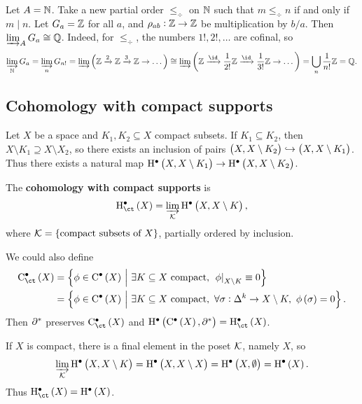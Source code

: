 \begin{example*}
Let $ A = \mathbb{N} $. Take a new partial order $ \le_{\div} $ on $ \mathbb{N} $ such that $ m \le_{\div} n $ if and only if $ m \mid n $. Let $ G_a = \mathbb{Z} $ for all $ a $, and $ \rho_{ab} : \mathbb{Z} \to \mathbb{Z} $ be multiplication by $ b / a $. Then $ \varinjlim_A G_a \cong \mathbb{Q} $. Indeed, for $ \le_{\div} $, the numbers $ 1!, 2!, \dots $ are cofinal, so
$$ \varinjlim_\NN G_a = \varinjlim_n G_{n!} = \varinjlim \br{\ZZ \xrightarrow{2} \ZZ \xrightarrow{3} \ZZ \to \dots} \cong \varinjlim \br{\ZZ \xrightarrow{\id} \dfrac{1}{2!}\ZZ \xrightarrow{\id} \dfrac{1}{3!}\ZZ \to \dots} = \bigcup_n \dfrac{1}{n!}\ZZ = \QQ. $$
\end{example*}

\subsection{Cohomology with compact supports}

Let $ X $ be a space and $ K_1, K_2 \subseteq X $ compact subsets. If $ K_1 \subseteq K_2 $, then $ X \setminus K_1 \supseteq X \setminus X_2 $, so there exists an inclusion of pairs $ \br{X, X \setminus K_2} \hookrightarrow \br{X, X \setminus K_1} $. Thus there exists a natural map $ \H^\bullet\br{X, X \setminus K_1} \to \H^\bullet\br{X, X \setminus K_2} $.

\begin{definition*}
The \textbf{cohomology with compact supports} is
$$ \Hc^\bullet\br{X} = \varinjlim_\KKK \H^\bullet\br{X, X \setminus K}, $$
where $ \KKK = \cbr{\text{compact subsets of} \ X} $, partially ordered by inclusion.
\end{definition*}

\begin{remark*}
We could also define
\begin{align*}
\C_{\ct}^\bullet\br{X}
& = \cbr{\phi \in \C^\bullet\br{X} \st \exists K \subseteq X \ \text{compact}, \ \eval{\phi}_{X \setminus K} \equiv 0} \\
& = \cbr{\phi \in \C^\bullet\br{X} \st \exists K \subseteq X \ \text{compact}, \ \forall \sigma : \Delta^k \to X \setminus K, \ \phi\br{\sigma} = 0}.
\end{align*}
Then $ \partial^* $ preserves $ \C_{\ct}^\bullet\br{X} $ and $ \H^\bullet\br{\C^\bullet\br{X}, \da^*} = \Hc^\bullet\br{X} $.
\end{remark*}

\pagebreak

\begin{example*}
If $ X $ is compact, there is a final element in the poset $ \mathcal{K} $, namely $ X $, so
$$ \varinjlim_\KKK \H^\bullet\br{X, X \setminus K} = \H^\bullet\br{X, X \setminus X} = \H^\bullet\br{X, \emptyset} = \H^\bullet\br{X}. $$
Thus $ \Hc^\bullet\br{X} = \H^\bullet\br{X} $.
\end{example*}

